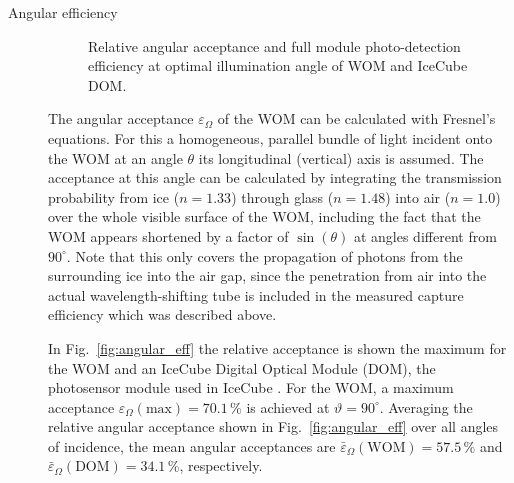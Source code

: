 \begin{description}
\item[Angular efficiency]

\begin{figure}[htb]
\centering
  \caption{Relative angular acceptance \protect{} and full
    module photo-detection efficiency at optimal illumination angle
    \protect{} of WOM and IceCube DOM.}
\label{fig:WOM_DOM_effs}
\end{figure}


The angular acceptance $\varepsilon_\Omega$ of the WOM can be calculated with 
Fresnel's equations. For this a homogeneous, parallel bundle of light incident
onto the WOM at an angle $\theta$ \wrt its longitudinal (\ie vertical) axis is
assumed. The acceptance at this angle can be calculated by integrating the
transmission probability from ice ($n=1.33$) through glass ($n=1.48$) into air
($n=1.0$) over the whole visible surface of the WOM, including the fact that the
WOM appears shortened by a factor of $\sin(\theta)$ at angles different from
$90^\circ$. Note that this only covers the propagation of photons from the
surrounding ice into the air gap, since the penetration from air into the
actual wavelength-shifting tube is included in the measured capture efficiency
which was described above.

In Fig.~\ref{fig:angular_eff} the relative acceptance is shown \wrt the maximum 
for the WOM and an IceCube Digital Optical Module (DOM), the photosensor module 
used in IceCube \cite{ICdom}. For the WOM, a maximum acceptance 
$\varepsilon_\Omega(\mathrm{max}) = 70.1\,\%$ is achieved at 
$\vartheta=90^\circ$. Averaging the relative angular acceptance shown in 
Fig.~\ref{fig:angular_eff} over all angles of incidence, the mean angular 
acceptances are $\bar\varepsilon_\Omega(\mathrm{WOM}) = 57.5\,\%$ and 
$\bar\varepsilon_\Omega(\mathrm{DOM}) = 34.1\,\%$, respectively.

\end{description}


